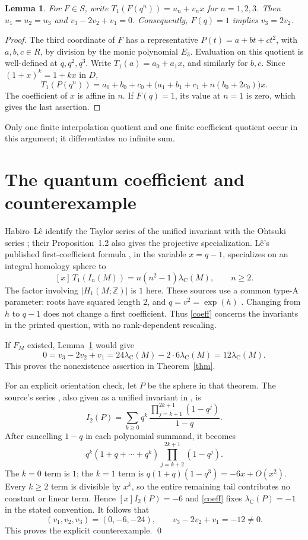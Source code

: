 \documentclass[11pt]{article}
\newtheorem{lemma}{Lemma}
\newcommand{\Z}{\mathbb Z}
\newcommand{\Cass}{\lambda_{\mathrm C}}
\begin{document}
\begin{lemma}\label{lem}
For $F\in S$, write $T_1(F(q^n))=u_n+v_nx$ for $n=1,2,3$.
Then $u_1=u_2=u_3$ and $v_3-2v_2+v_1=0$.
Consequently, $F(q)=1$ implies $v_3=2v_2$.
\end{lemma}
\begin{proof}
The third coordinate of $F$ has a representative
$P(t)=a+bt+ct^2$, with $a,b,c\in R$, by division by the monic
polynomial $E_3$. Evaluation on this quotient is well-defined at
$q,q^2,q^3$. Write $T_1(a)=a_0+a_1x$, and similarly for $b,c$.
Since $(1+x)^k=1+kx$ in $D$,
\[
 T_1(P(q^n))=
 a_0+b_0+c_0+
 \bigl(a_1+b_1+c_1+n(b_0+2c_0)\bigr)x .
\]
The coefficient of $x$ is affine in $n$. If $F(q)=1$, its value at
$n=1$ is zero, which gives the last assertion.
\end{proof}
Only one finite interpolation quotient and one finite coefficient
quotient occur in this argument; it differentiates no infinite sum.

\section{The quantum coefficient and counterexample}
Habiro--L\^e identify the Taylor series of the unified invariant with
the Ohtsuki series \cite[Proposition~1.9]{HL}; their
Proposition~1.2 also gives the projective specialization.
L\^e's published first-coefficient formula
\cite[p.~821]{L}, in the variable $x=q-1$, specializes on an integral
homology sphere to
\begin{equation}\label{coeff}
 [x]\,T_1(I_n(M))=n(n^2-1)\Cass(M),\qquad n\ge2 .
\end{equation}
The factor involving $|H_1(M;\Z)|$ is $1$ here.
These sources use a common type-A parameter: roots have squared length
$2$, and $q=v^2=\exp(h)$ \cite[\S3A1--2]{HL}.
Changing from $h$ to $q-1$ does not change a first coefficient.
Thus \eqref{coeff} concerns the invariants in the printed question,
with no rank-dependent rescaling.

If $F_M$ existed, Lemma~\ref{lem} would give
\[
 0=v_3-2v_2+v_1
   =24\Cass(M)-2\cdot6\Cass(M)=12\Cass(M).
\]
This proves the nonexistence assertion in Theorem~\ref{thm}.

For an explicit orientation check, let $P$ be the sphere in that theorem.
The source's series \cite[p.~492]{O}, also given as a unified invariant
in \cite[\S16.1, equation~(16.1)]{H}, is
\[
 I_2(P)=\sum_{k\ge0}
       q^k\,\frac{\prod_{j=k+1}^{2k+1}(1-q^j)}{1-q}.
\]
After cancelling $1-q$ in each polynomial summand, it becomes
\[
 q^k(1+q+\cdots+q^k)
       \prod_{j=k+2}^{2k+1}(1-q^j).
\]
The $k=0$ term is $1$; the $k=1$ term is
$q(1+q)(1-q^3)=-6x+O(x^2)$.
Every $k\ge2$ term is divisible by $x^k$, so the entire remaining
tail contributes no constant or linear term.
Hence $[x]I_2(P)=-6$ and \eqref{coeff} fixes $\Cass(P)=-1$
in the stated convention. It follows that
\[
 (v_1,v_2,v_3)=(0,-6,-24),\qquad
 v_3-2v_2+v_1=-12\ne0.
\]
This proves the explicit counterexample. \qed
\end{document}
